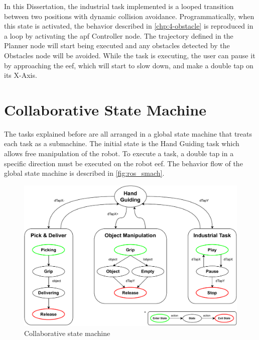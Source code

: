 \par In this Dissertation, the industrial task implemented is a looped transition between two positions with dynamic collision avoidance. Programmatically, when this state is activated, the behavior described in \autoref{chp:4-obstacle} is reproduced in a loop by activating the \ac{apf} Controller node. The trajectory defined in the Planner node will start being executed and any obstacles detected by the Obstacles node will be avoided. While the task is executing, the user can pause it by approaching the \ac{eef}, which will start to slow down, and make a double tap on its X-Axis.





\section{Collaborative State Machine}


\par The tasks explained before are all arranged in a global state machine that treats each task as a submachine. The initial state is the Hand Guiding task which allows free manipulation of the robot. To execute a task, a double tap in a specific direction must be executed on the robot \ac{eef}. The behavior flow of the global state machine is described in \autoref{fig:ros_smach}.

\begin{figure}[h]
    \centering
    \includegraphics[width=0.8\linewidth]{figs/chp5/ros_ur10e_smach.pdf}
    \caption{Collaborative state machine}
    \label{fig:ros_smach}
\end{figure}

